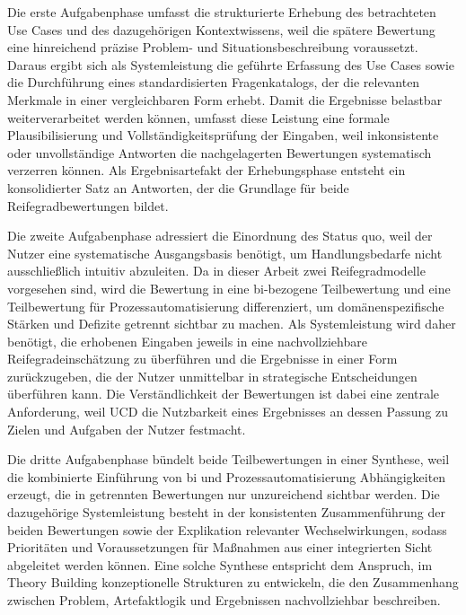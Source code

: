 Die erste Aufgabenphase umfasst die strukturierte Erhebung des betrachteten Use Cases und des dazugehörigen Kontextwissens, weil die spätere Bewertung eine hinreichend präzise Problem- und Situationsbeschreibung voraussetzt. \cite{iso9241_210_2019}
Daraus ergibt sich als Systemleistung die geführte Erfassung des Use Cases sowie die Durchführung eines standardisierten Fragenkatalogs, der die relevanten Merkmale in einer vergleichbaren Form erhebt.
Damit die Ergebnisse belastbar weiterverarbeitet werden können, umfasst diese Leistung eine formale Plausibilisierung und Vollständigkeitsprüfung der Eingaben, weil inkonsistente oder unvollständige Antworten die nachgelagerten Bewertungen systematisch verzerren können. \cite{iso9241_210_2019}
Als Ergebnisartefakt der Erhebungsphase entsteht ein konsolidierter Satz an Antworten, der die Grundlage für beide Reifegradbewertungen bildet.

Die zweite Aufgabenphase adressiert die Einordnung des Status quo, weil der Nutzer eine systematische Ausgangsbasis benötigt, um Handlungsbedarfe nicht ausschließlich intuitiv abzuleiten. \cite{normanDraper1986}
Da in dieser Arbeit zwei Reifegradmodelle vorgesehen sind, wird die Bewertung in eine \gls{bi}-bezogene Teilbewertung und eine Teilbewertung für Prozessautomatisierung differenziert, um domänenspezifische Stärken und Defizite getrennt sichtbar zu machen.
Als Systemleistung wird daher benötigt, die erhobenen Eingaben jeweils in eine nachvollziehbare Reifegradeinschätzung zu überführen und die Ergebnisse in einer Form zurückzugeben, die der Nutzer unmittelbar in strategische Entscheidungen überführen kann. \cite{normanDraper1986}
Die Verständlichkeit der Bewertungen ist dabei eine zentrale Anforderung, weil UCD die Nutzbarkeit eines Ergebnisses an dessen Passung zu Zielen und Aufgaben der Nutzer festmacht. \cite{iso9241_210_2019}

Die dritte Aufgabenphase bündelt beide Teilbewertungen in einer Synthese, weil die kombinierte Einführung von \gls{bi} und Prozessautomatisierung Abhängigkeiten erzeugt, die in getrennten Bewertungen nur unzureichend sichtbar werden.
Die dazugehörige Systemleistung besteht in der konsistenten Zusammenführung der beiden Bewertungen sowie der Explikation relevanter Wechselwirkungen, sodass Prioritäten und Voraussetzungen für Maßnahmen aus einer integrierten Sicht abgeleitet werden können. \cite{normanDraper1986}
Eine solche Synthese entspricht dem Anspruch, im Theory Building konzeptionelle Strukturen zu entwickeln, die den Zusammenhang zwischen Problem, Artefaktlogik und Ergebnissen nachvollziehbar beschreiben. \cite{nunamaker1990}

